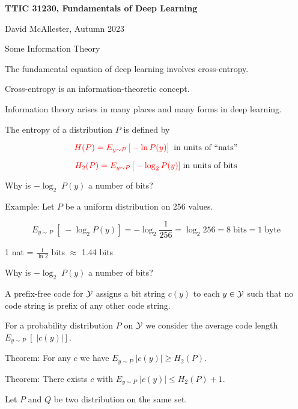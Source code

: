 




{\Huge
  \centerline{\bf TTIC 31230,  Fundamentals of Deep Learning}
  \vfill
  \centerline{David McAllester, Autumn 2023}
  \vfill
\centerline{Some Information Theory}


The fundamental equation of deep learning involves cross-entropy.

\vfill
Cross-entropy is an information-theoretic concept.

\vfill
Information theory arises in many places and many forms in deep learning.


The entropy of a distribution $P$ is defined by

\vfill
$${\color{red} H(P) = E_{y \sim P} \left[ \;- \ln P(y)\right]}\;\;\mbox{in units of ``nats''}$$

\vfill
$${\color{red} H_2(P) = E_{y \sim P}\left[ \;- \log_2 P(y)\right]}\; \mbox{in units of bits}$$


Why is $-\log_2\;P(y)$ a number of bits?

\vfill
Example: Let $P$ be a uniform distribution on 256 values.

\vfill
$$E_{y \sim P}\;\left[\;-\log_2 P(y)\right] = - \log_2 \frac{1}{256} = \log_2 256 = 8\;\mathrm{bits} = 1\;\mathrm{byte}$$

\vfill
\centerline{\color{red} 1 nat = $\frac{1}{\ln 2}$ bits $\approx$ 1.44 bits}


Why is $-\log_2\;P(y)$ a number of bits?

\vfill
A prefix-free code for ${\cal Y}$ assigns a bit string $c(y)$ to each $y \in {\cal Y}$ such that no code string is prefix of any other code string.

\vfill
For a probability distribution $P$ on ${\cal Y}$ we consider the average code length $E_{y \sim P}\;\left[ \;|c(y)|\right]$.

\vfill
Theorem: For any $c$ we have {\color{red} $E_{y \sim P}\;|c(y)|  \geq H_2(P)$}.

\vfill
Theorem: There exists $c$ with {\color{red} $E_{y \sim P} \;|c(y)| \leq H_2(P) +1$}.


Let $P$ and $Q$ be two distribution on the same set.

}
